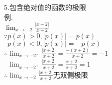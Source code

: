 5.包含绝对值的函数的极限\\
例.\\
\phantom{例}$\displaystyle\lim_{x\to-2}\frac{|x+2|}{x+2}$\\
$\displaystyle\because p(x)>0, |p(x)|=p(x)$\\ 
$\displaystyle\phantom{\because}p(x)<0, |p(x)|=-p(x)$\\
$\displaystyle\therefore\lim_{x\to -2^-}\frac{|x+2|}{x+2}=\frac{-(x+2)}{x+2}=-1$\\
$\displaystyle\phantom{\therefore}\lim_{x\to -2^+}\frac{|x+2|}{x+2}=\frac{x+2}{x+2}=1$\\
$\displaystyle\therefore\lim_{x\to -2}\frac{|x+2|}{x+2}\text{无双侧极限}$\\


